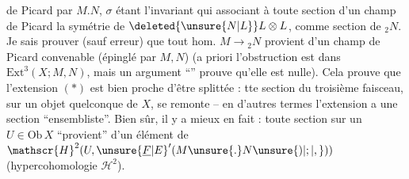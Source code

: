 \margin{\mbox{-- --}}

 de Picard  par $M.N$, $\sigma$ étant l'invariant qui  associant à toute section  d'un champ de Picard la symétrie de $\deleted{\unsure{N|L}}L\otimes L$,  comme section de ${}_{2}N$. Je sais prouver (sauf erreur) que tout hom. $M\to{}_{2}N$ provient d'un champ de Picard convenable (épinglé par $M,N$) (a priori l'obstruction est dans $\mathrm{Ext}^{3}(X;M,N)$, mais un argument ``'' prouve qu'elle est nulle). Cela prouve que l'extension $(*)$ est bien proche d'être splittée :  tte section du troisième faisceau, sur un objet quelconque de $X$, se remonte -- en d'autres termes l'extension a une section ``ensembliste''. Bien sûr, il y a mieux en fait : toute section sur un $U\in\mathrm{Ob}\,X$ ``provient'' d'un élément de $\mathscr{H}^{2}(U,{\unsure{\underline{F}|E}}'(M\unsure{.}N\unsure{)|;|,}))$ (hypercohomologie $\mathscr{H}^{2}$).

